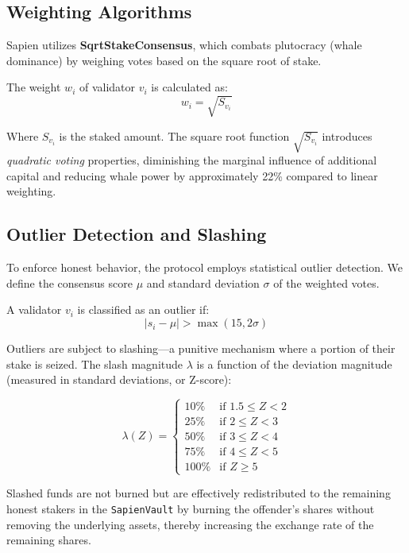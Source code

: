 \documentclass[11pt, a4paper]{article}
\begin{document}
\subsection{Weighting Algorithms}

Sapien utilizes \textbf{SqrtStakeConsensus}, which combats plutocracy (whale dominance) by weighing votes based on the square root of stake.

The weight $w_i$ of validator $v_i$ is calculated as:
\begin{equation}
    w_i = \sqrt{S_{v_i}}
\end{equation}

Where $S_{v_i}$ is the staked amount. The square root function $\sqrt{S_{v_i}}$ introduces \textit{quadratic voting} properties, diminishing the marginal influence of additional capital and reducing whale power by approximately 22\% compared to linear weighting.

\subsection{Outlier Detection and Slashing}

To enforce honest behavior, the protocol employs statistical outlier detection. We define the consensus score $\mu$ and standard deviation $\sigma$ of the weighted votes.

A validator $v_i$ is classified as an outlier if:
\begin{equation}
    |s_i - \mu| > \max(15, 2\sigma)
\end{equation}

Outliers are subject to slashing—a punitive mechanism where a portion of their stake is seized. The slash magnitude $\lambda$ is a function of the deviation magnitude (measured in standard deviations, or Z-score):

\begin{equation}
    \lambda(Z) = 
    \begin{cases} 
      10\% & \text{if } 1.5 \le Z < 2 \\
      25\% & \text{if } 2 \le Z < 3 \\
      50\% & \text{if } 3 \le Z < 4 \\
      75\% & \text{if } 4 \le Z < 5 \\
      100\% & \text{if } Z \ge 5 
   \end{cases}
\end{equation}

Slashed funds are not burned but are effectively redistributed to the remaining honest stakers in the \texttt{SapienVault} by burning the offender's shares without removing the underlying assets, thereby increasing the exchange rate of the remaining shares.
\end{document}
